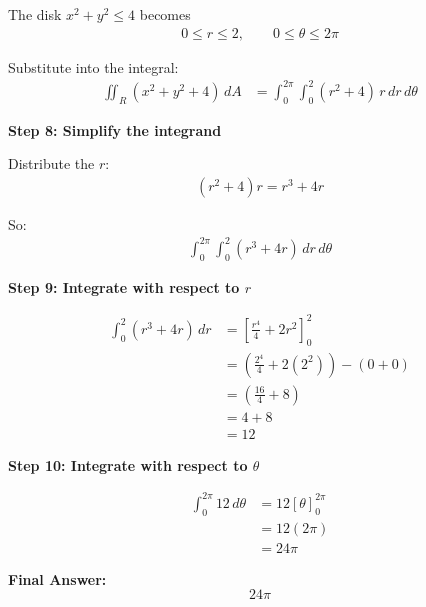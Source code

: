 \begin{examplebox}
    The disk $x^2+y^2\le 4$ becomes
    \begin{align*}
        0 \le r \le 2, \qquad 0 \le \theta \le 2\pi
    \end{align*}

    Substitute into the integral:
    \begin{align*}
        \iint_R (x^2+y^2+4)\, dA
         & =
        \int_0^{2\pi}\int_0^2 (r^2+4)\,r\,dr\,d\theta
    \end{align*}

    \textbf{Step 8: Simplify the integrand}

    Distribute the $r$:
    \begin{align*}
        (r^2+4)r = r^3+4r
    \end{align*}

    So:
    \begin{align*}
        \int_0^{2\pi}\int_0^2 (r^3+4r)\,dr\,d\theta
    \end{align*}

    \textbf{Step 9: Integrate with respect to $r$}

    \begin{align*}
        \int_0^2 (r^3+4r)\,dr
         & =
        \left[\frac{r^4}{4}+2r^2\right]_0^2                \\
         & =
        \left(\frac{2^4}{4}+2(2^2)\right)-\left(0+0\right) \\
         & =
        \left(\frac{16}{4}+8\right)                        \\
         & =
        4+8                                                \\
         & =
        12
    \end{align*}

    \textbf{Step 10: Integrate with respect to $\theta$}

    \begin{align*}
        \int_0^{2\pi} 12\, d\theta
         & = 12[\theta]_0^{2\pi} \\
         & = 12(2\pi)            \\
         & = 24\pi
    \end{align*}

    \textbf{Final Answer:}
    \begin{equation*}
        \boxed{24\pi}
    \end{equation*}
\end{examplebox}

